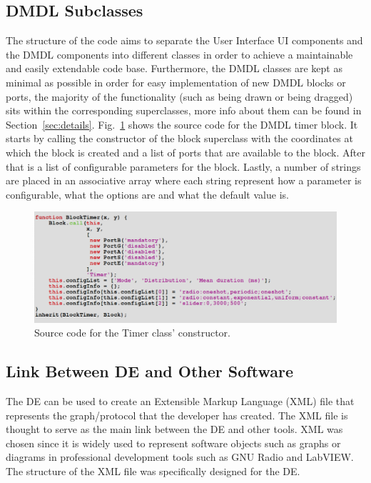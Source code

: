 \documentclass[journal,comsoc]{IEEEtran}
\begin{document}
\subsection{DMDL Subclasses}
\label{sec:subclasses}
The structure of the code aims to separate the User Interface UI components and the DMDL components
into different classes in order to achieve a maintainable and easily extendable code base.
Furthermore, the DMDL classes are kept as minimal as possible in order for easy implementation
of new DMDL blocks or ports, the majority of the functionality (such as being drawn or being
dragged) sits within the corresponding superclasses, more info about them can be found in
Section~\ref{sec:details}. Fig.~\ref{fig:timer_src} shows the source code for the DMDL timer block.
It starts by calling the constructor of the block superclass with the coordinates at which the
block is created and a list of ports that are available to the block. After that is a list of 
configurable parameters for the block. Lastly, a number of strings are placed in an associative
array where each string represent how a parameter is configurable, what the options are and what
the default value is.
\begin{figure}[!t]
\centering
    \includegraphics[width=\columnwidth]{timer_src.png}
    \caption{Source code for the Timer class' constructor.}
    \label{fig:timer_src}
\end{figure}

\subsection{Link Between DE and Other Software}
The DE can be used to create an Extensible Markup Language (XML) file that represents the
graph/protocol that the developer has created. The XML file is thought to serve as the main link
between the DE and other tools. XML was chosen since it is widely used to represent software
objects such as graphs or diagrams in professional development tools such as GNU Radio and
LabVIEW. The structure of the XML file was specifically designed for the DE.
\end{document}
